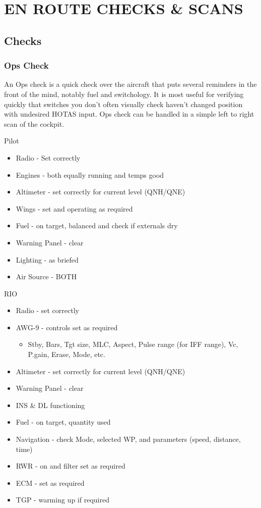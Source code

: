 \section{EN ROUTE CHECKS \& SCANS}

\subsection{Checks}

\subsubsection{Ops Check}

An Ops check is a quick check over the aircraft that puts several reminders in
the front of the mind, notably fuel and switchology. It is most useful for
verifying quickly that switches you don't often visually check haven't changed
position with undesired HOTAS input. Ops check can be handled in a simple left
to right scan of the cockpit.

Pilot

\begin{itemize}
  \item Radio - Set correctly
  \item Engines - both equally running and temps good
  \item Altimeter - set correctly for current level (QNH/QNE)
  \item Wings - set and operating as required
  \item Fuel - on target, balanced and check if externals dry
  \item Warning Panel - clear
  \item Lighting - as briefed
  \item Air Source - BOTH
\end{itemize}

RIO

\begin{itemize}
  \item Radio - set correctly
  \item AWG-9 - controls set as required
  \begin{itemize}
    \item Stby, Bars, Tgt size, MLC, Aspect, Pulse range (for IFF range), Vc,
    P.gain, Erase, Mode, etc.
  \end{itemize}
  \item Altimeter - set correctly for current level (QNH/QNE)
  \item Warning Panel - clear
  \item INS \& DL functioning
  \item Fuel - on target, quantity used
  \item Navigation - check Mode, selected WP, and parameters (speed, distance,
  time)
  \item RWR - on and filter set as required
  \item ECM - set as required
  \item TGP - warming up if required
\end{itemize}

